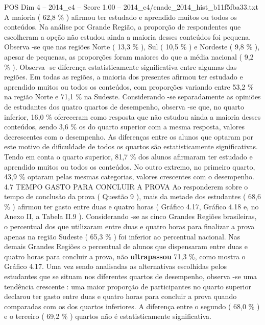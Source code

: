 \begin{textsample}{POS Dim 4 – 2014\_c4 – Score 1.00 – 2014\_c4/enade\_2014\_hist\_b11f5fba33.txt}
A maioria ( 62,8 \% ) afirmou ter estudado e aprendido muitos ou todos os conteúdos.
Na análise por Grande Região, a proporção de respondentes que escolheram a opção não estudou ainda a maioria desses conteúdos foi pequena.
Observa -se que nas regiões Norte ( 13,3 \% ), Sul ( 10,5 \% ) e Nordeste ( 9,8 \% ), apesar de pequenas, as proporções foram maiores do que a média nacional ( 9,2 \% ).
Observa -se diferença estatisticamente significativa entre algumas das regiões.
Em todas as regiões, a maioria dos presentes afirmou ter estudado e aprendido muitos ou todos os conteúdos, com proporções variando entre 53,2 \% na região Norte e 71,1 \% na Sudeste.
Considerando -se separadamente as opiniões de estudantes dos quatro quartos de desempenho, observa -se que, no quarto inferior, 16,0 \% ofereceram como resposta que não estudou ainda a maioria desses conteúdos, sendo 3,6 \% os do quarto superior com a mesma resposta, valores decrescentes com o desempenho.
As diferenças entre os alunos que optaram por este motivo de dificuldade de todos os quartos são estatisticamente significativas.
Tendo em conta o quarto superior, 81,7 \% dos alunos afirmaram ter estudado e aprendido muitos ou todos os conteúdos.
No outro extremo, no primeiro quarto, 43,9 \% optaram pelas mesmas categorias, valores crescentes com o desempenho. 4.7 TEMPO GASTO PARA CONCLUIR A PROVA Ao responderem sobre o tempo de conclusão da prova ( Questão 9 ), mais da metade dos estudantes ( 68,6 \% ) afirmou ter gasto entre duas e quatro horas ( Gráfico 4.17, Gráfico 4.18 e, no Anexo II, a Tabela II.9 ).
Considerando -se as cinco Grandes Regiões brasileiras, o percentual dos que utilizaram entre duas e quatro horas para finalizar a prova apenas na região Sudeste ( 65,3 \% ) foi inferior ao percentual nacional.
Nas demais Grandes Regiões o percentual de alunos que dispensaram entre duas e quatro horas para concluir a prova, não \textbf{ultrapassou} 71,3 \%, como mostra o Gráfico 4.17.
Uma vez sendo analisadas as alternativas escolhidas pelos estudantes que se situam nos diferentes quartos de desempenho, observa -se uma tendência crescente : uma maior proporção de participantes no quarto superior declarou ter gasto entre duas e quatro horas para concluir a prova quando comparadas com os dos quartos inferiores.
A diferença entre o segundo ( 68,0 \% ) e o terceiro ( 69,2 \% ) quartos não é estatisticamente significativa.

\end{textsample}

